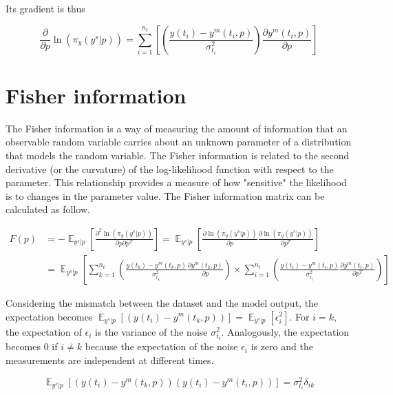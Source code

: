 \documentclass[]{scrartcl}
\begin{document}
Its gradient is thus

\begin{equation}
	\frac{\partial}{\partial p} \ln (\pi_y (y^s|p)) =  \sum_{i=1}^{n_t}  \left[ \left( \frac{y(t_i) - y^m(t_i, p)}{\sigma_{t_i}^2} \right) \frac{\partial y^m(t_i, p)}{\partial p} \right]
\end{equation}

\section{Fisher information}

The Fisher information is a way of measuring the amount of information that an observable random variable carries about an unknown parameter of a distribution that models the random variable. The Fisher information is related to the second derivative (or the curvature) of the log-likelihood function with respect to the parameter. This relationship provides a measure of how "sensitive" the likelihood is to changes in the parameter value. The Fisher information matrix can be calculated as follow.

\begin{align}
	F(p) &= - \mathop{\mathbb{E}}_{y^s|p} \left[ \frac{\partial^2 \ln (\pi_y (y^s|p))}{\partial p \partial p^T} \right] = \mathop{\mathbb{E}}_{y^s|p} \left[ \frac{\partial \ln (\pi_y (y^s|p))}{\partial p} \frac{\partial \ln (\pi_y (y^s|p))}{\partial p^T} \right] \\
	&= \mathop{\mathbb{E}}_{y^s|p} \left[ \sum_{k=1}^{n_t} \left( \frac{y(t_k) - y^m(t_k, p)}{\sigma_{t_k}^2} \frac{\partial y^m(t_k, p)}{\partial p} \right) \times  \sum_{i=1}^{n_t} \left( \frac{y(t_i) - y^m(t_i, p)}{\sigma_{t_i}^2} \frac{\partial y^m(t_i, p)}{\partial p^T} \right) \right]
\end{align}

Considering the mismatch between the dataset and the model output, the expectation becomes $\mathop{\mathbb{E}}_{y^s|p} \left[ \left( y(t_i) - y^m(t_k, p) \right) \right] = \mathop{\mathbb{E}}_{y^s|p} \left[ \epsilon_i^2 \right]$. For $i=k$, the expectation of $\epsilon_i$ is the variance of the noise $\sigma_{t_i}^2$. Analogously, the expectation becomes 0 if $i \neq k$ because the expectation of the noise $\epsilon_i$ is zero and the measurements are independent at different times.

\begin{equation}
	\mathop{\mathbb{E}}_{y^s|p} \left[ \left( y(t_i) - y^m(t_k, p) \right) \left( y(t_i) - y^m(t_i, p) \right) \right] = \sigma_{t_i}^2 \delta_{ik}
\end{equation}
\end{document}
